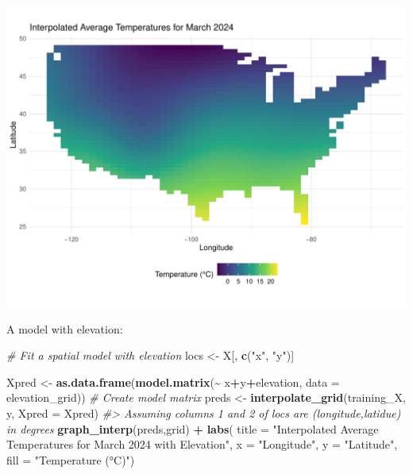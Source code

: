 \documentclass[
]{article}
\newenvironment{Shaded}{\begin{snugshade}}{\end{snugshade}}
\newcommand{\AttributeTok}[1]{\textcolor[rgb]{0.13,0.29,0.53}{#1}}
\newcommand{\CommentTok}[1]{\textcolor[rgb]{0.56,0.35,0.01}{\textit{#1}}}
\newcommand{\FunctionTok}[1]{\textcolor[rgb]{0.13,0.29,0.53}{\textbf{#1}}}
\newcommand{\NormalTok}[1]{#1}
\newcommand{\OtherTok}[1]{\textcolor[rgb]{0.56,0.35,0.01}{#1}}
\newcommand{\SpecialCharTok}[1]{\textcolor[rgb]{0.81,0.36,0.00}{\textbf{#1}}}
\newcommand{\StringTok}[1]{\textcolor[rgb]{0.31,0.60,0.02}{#1}}
\begin{document}
\includegraphics{seesaw_files/figure-latex/unnamed-chunk-4-1.pdf}

A model with elevation:

\begin{Shaded}
\begin{Highlighting}[]
\CommentTok{\# Fit a spatial model with elevation}
\NormalTok{locs }\OtherTok{\textless{}{-}}\NormalTok{ X[, }\FunctionTok{c}\NormalTok{(}\StringTok{"x"}\NormalTok{, }\StringTok{"y"}\NormalTok{)]}

\NormalTok{Xpred }\OtherTok{\textless{}{-}} \FunctionTok{as.data.frame}\NormalTok{(}\FunctionTok{model.matrix}\NormalTok{(}\SpecialCharTok{\textasciitilde{}}\NormalTok{ x}\SpecialCharTok{+}\NormalTok{y}\SpecialCharTok{+}\NormalTok{elevation, }\AttributeTok{data =}\NormalTok{ elevation\_grid))}
\CommentTok{\# Create model matrix}
\NormalTok{preds }\OtherTok{\textless{}{-}} \FunctionTok{interpolate\_grid}\NormalTok{(training\_X, y, }\AttributeTok{Xpred =}\NormalTok{ Xpred)}
\CommentTok{\#\textgreater{} Assuming columns 1 and 2 of locs are (longitude,latidue) in degrees}
\FunctionTok{graph\_interp}\NormalTok{(preds,grid) }\SpecialCharTok{+} 
  \FunctionTok{labs}\NormalTok{( }\AttributeTok{title =} \StringTok{"Interpolated Average Temperatures for March 2024 with Elevation"}\NormalTok{,}
    \AttributeTok{x =} \StringTok{"Longitude"}\NormalTok{, }\AttributeTok{y =} \StringTok{"Latitude"}\NormalTok{, }
    \AttributeTok{fill =} \StringTok{"Temperature (°C)"}\NormalTok{)}
\end{Highlighting}
\end{Shaded}
\end{document}
